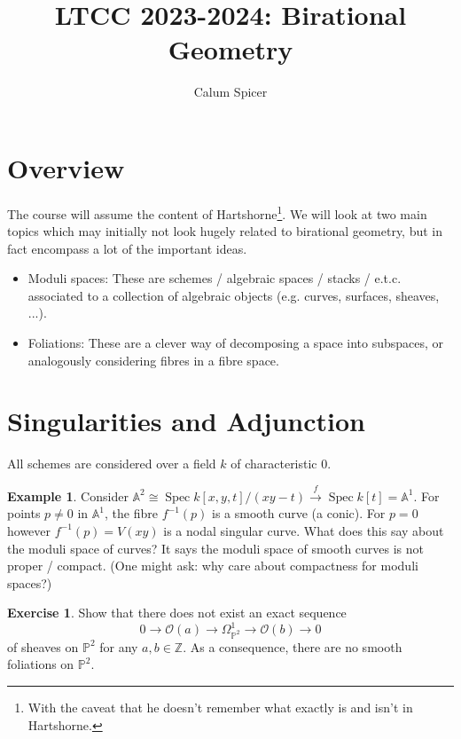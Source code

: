 \documentclass{article}
\title{LTCC 2023-2024: Birational Geometry}
\author{Calum Spicer}
\date{}
\theoremstyle{definition}
\newtheorem*{example}{Example}
\newtheorem*{exercise}{Exercise}
\DeclareMathOperator{\Spec}{Spec}
\renewcommand{\O}{\mathcal{O}}
\newcommand{\A}{\mathbb{A}}
\renewcommand{\P}{\mathbb{P}}
\newcommand{\Z}{\mathbb{Z}}
\begin{document}
\maketitle

\section*{Overview}

The course will assume the content of Hartshorne\footnote{With the caveat that
he doesn't remember what exactly is and isn't in Hartshorne.}. We will look at
two main topics which may initially not look hugely related to birational
geometry, but in fact encompass a lot of the important ideas.
\begin{itemize}
    \item Moduli spaces: These are schemes / algebraic spaces / stacks / e.t.c.
        associated to a collection of algebraic objects (e.g. curves, surfaces,
        sheaves, ...).

    \item Foliations: These are a clever way of decomposing a space into
        subspaces, or analogously considering fibres in a fibre space.
\end{itemize}

\section*{Singularities and Adjunction}

All schemes are considered over a field $k$ of characteristic 0.

\begin{example}
    Consider $\A^2\cong\Spec k[x,y,t]/(xy-t)\xrightarrow{f}\Spec k[t]=\A^1$. For
    points $p\ne0$ in $\A^1$, the fibre $f^{-1}(p)$ is a smooth curve (a conic).
    For $p=0$ however  $f^{-1}(p)=V(xy)$ is a nodal singular curve. What does
    this say about the moduli space of curves? It says the moduli space of
    smooth curves is not proper / compact. (One might ask: why care about
    compactness for moduli spaces?)
\end{example}

\begin{exercise}
    Show that there does not exist an exact sequence
    \begin{equation*}
        0 \to \O(a) \to \Omega^1_{\P^2} \to \O(b) \to 0
    \end{equation*}
    of sheaves on $\P^2$ for any $a,b\in\Z$. As a consequence, there are no
    smooth foliations on $\P^2$.
\end{exercise}
\end{document}
